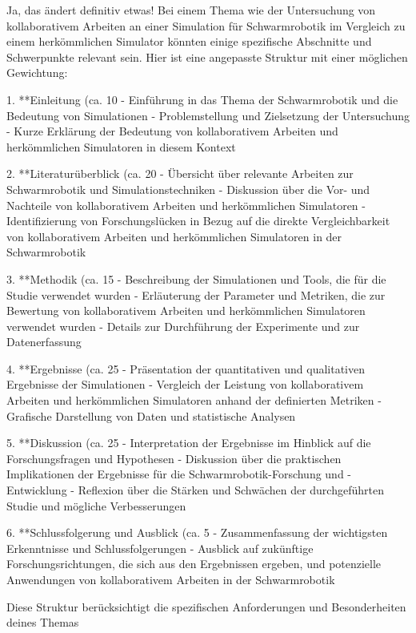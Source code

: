 \documentclass[german,version-2020-11]{uzl-thesis}
\begin{document}
   Ja, das ändert definitiv etwas! Bei einem Thema wie der Untersuchung von kollaborativem Arbeiten an einer Simulation 
   für Schwarmrobotik im Vergleich zu einem herkömmlichen Simulator könnten einige spezifische Abschnitte und Schwerpunkte 
   relevant sein. Hier ist eine angepasste Struktur mit einer möglichen Gewichtung:

1. **Einleitung (ca. 10%
   - Einführung in das Thema der Schwarmrobotik und die Bedeutung von Simulationen
   - Problemstellung und Zielsetzung der Untersuchung
   - Kurze Erklärung der Bedeutung von kollaborativem Arbeiten und herkömmlichen Simulatoren in diesem Kontext

2. **Literaturüberblick (ca. 20%
   - Übersicht über relevante Arbeiten zur Schwarmrobotik und Simulationstechniken
   - Diskussion über die Vor- und Nachteile von kollaborativem Arbeiten und herkömmlichen Simulatoren
   - Identifizierung von Forschungslücken in Bezug auf die direkte Vergleichbarkeit von kollaborativem Arbeiten und herkömmlichen Simulatoren in der Schwarmrobotik

3. **Methodik (ca. 15%
   - Beschreibung der Simulationen und Tools, die für die Studie verwendet wurden
   - Erläuterung der Parameter und Metriken, die zur Bewertung von kollaborativem Arbeiten und herkömmlichen Simulatoren verwendet wurden
   - Details zur Durchführung der Experimente und zur Datenerfassung

4. **Ergebnisse (ca. 25%
   - Präsentation der quantitativen und qualitativen Ergebnisse der Simulationen
   - Vergleich der Leistung von kollaborativem Arbeiten und herkömmlichen Simulatoren anhand der definierten Metriken
   - Grafische Darstellung von Daten und statistische Analysen

5. **Diskussion (ca. 25%
   - Interpretation der Ergebnisse im Hinblick auf die Forschungsfragen und Hypothesen
   - Diskussion über die praktischen Implikationen der Ergebnisse für die Schwarmrobotik-Forschung und -Entwicklung
   - Reflexion über die Stärken und Schwächen der durchgeführten Studie und mögliche Verbesserungen

6. **Schlussfolgerung und Ausblick (ca. 5%
   - Zusammenfassung der wichtigsten Erkenntnisse und Schlussfolgerungen
   - Ausblick auf zukünftige Forschungsrichtungen, die sich aus den Ergebnissen ergeben, und potenzielle Anwendungen von kollaborativem Arbeiten in der Schwarmrobotik

Diese Struktur berücksichtigt die spezifischen Anforderungen und Besonderheiten deines Themas 
\end{document}
